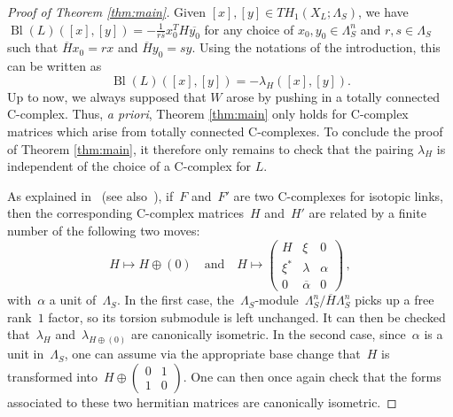 \documentclass[11pt,a4paper]{amsart}
\theoremstyle{definition}
\def\op{\operatorname}
\begin{document}
\begin{proof}[\textit{Proof of Theorem \ref{thm:main}}]
Given $[x],[y] \in TH_1(X_L;\Lambda_S)$, we have $\op{Bl}(L)([x],[y])=-\frac{1}{r\overline{s}} x_0^T H \overline{y_0}$ for any choice of $x_0,y_0 \in \Lambda_S^n$ and $r,s \in \Lambda_S$ such that $\overline{H}x_0=r x$ and $\overline{H}y_0=s y$. Using the notations of the introduction, this can be written as
$$\op{Bl}(L)([x],[y])=-\lambda_H([x],[y]).$$
Up to now, we always supposed that $W$ arose by pushing in a totally connected C-complex. Thus, \emph{a priori}, Theorem \ref{thm:main} only holds for C-complex matrices which arise from totally connected C-complexes. To conclude the proof of Theorem \ref{thm:main}, it therefore only remains to check that the pairing $\lambda_H$ is independent of the choice of a C-complex for $L$.

As explained in~\cite[p.~1230]{CimasoniFlorens} (see also~\cite{CimasoniPotential}), if~$F$ and~$F'$ are two C-complexes for isotopic links, then the corresponding C-complex matrices~$H$
and~$H'$ are related by a finite number of the following two moves:
\[
H\mapsto H\oplus(0) \quad \text{and} \quad H\mapsto \begin{pmatrix}
 H &\xi& 0 \\ \xi^*&\lambda&\alpha\\0&\overline{\alpha}&0 
\end{pmatrix}\,,
\]
with~$\alpha$ a unit of~$\Lambda_S$. In the first case, the~$\Lambda_S$-module~$\Lambda_S^n/\overline{H}\Lambda_S^n$ picks up a free rank~$1$ factor, so its torsion submodule is left
unchanged. It can then be checked that~$\lambda_H$ and~$\lambda_{H\oplus(0)}$ are canonically isometric. In the second case, since~$\alpha$ is a unit in~$\Lambda_S$,
one can assume via the appropriate base change that~$H$ is transformed into~$H\oplus\left(\begin{smallmatrix}0&1\\1&0\end{smallmatrix}\right)$. One can then once again check that the forms associated to these two hermitian matrices are canonically isometric.
\end{proof}
\end{document}
